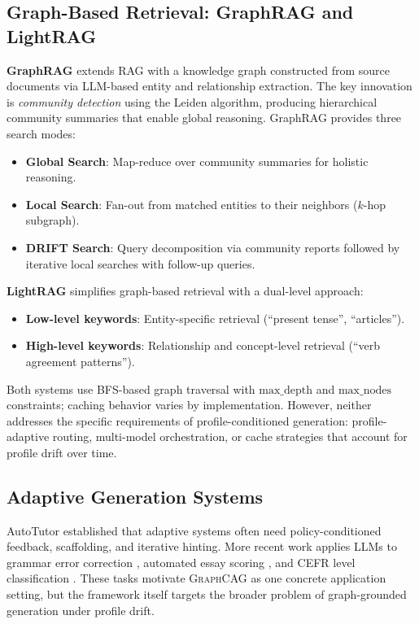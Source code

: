 \documentclass[11pt,a4paper,twocolumn]{article}
\newcommand{\graphcag}{\textsc{GraphCAG}}
\begin{document}
\subsection{Graph-Based Retrieval: GraphRAG and LightRAG}

\textbf{GraphRAG} \cite{edge2024graphrag} extends RAG with a knowledge graph constructed from source documents via LLM-based entity and relationship extraction. The key innovation is \emph{community detection} using the Leiden algorithm, producing hierarchical community summaries that enable global reasoning. GraphRAG provides three search modes:
\begin{itemize}[leftmargin=*]
  \item \textbf{Global Search}: Map-reduce over community summaries for holistic reasoning.
  \item \textbf{Local Search}: Fan-out from matched entities to their neighbors ($k$-hop subgraph).
  \item \textbf{DRIFT Search}: Query decomposition via community reports followed by iterative local searches with follow-up queries.
\end{itemize}

\textbf{LightRAG} \cite{guo2024lightrag} simplifies graph-based retrieval with a dual-level approach:
\begin{itemize}[leftmargin=*]
  \item \textbf{Low-level keywords}: Entity-specific retrieval (``present tense'', ``articles'').
  \item \textbf{High-level keywords}: Relationship and concept-level retrieval (``verb agreement patterns'').
\end{itemize}

Both systems use BFS-based graph traversal with $\text{max\_depth}$ and $\text{max\_nodes}$ constraints; caching behavior varies by implementation. However, neither addresses the specific requirements of profile-conditioned generation: profile-adaptive routing, multi-model orchestration, or cache strategies that account for profile drift over time.

\subsection{Adaptive Generation Systems}

AutoTutor \cite{graesser2004autotutor} established that adaptive systems often need policy-conditioned feedback, scaffolding, and iterative hinting. More recent work applies LLMs to grammar error correction \cite{fang2023gecllm}, automated essay scoring \cite{yang2020aes}, and CEFR level classification \cite{vajjala2018cefr}. These tasks motivate \graphcag{} as one concrete application setting, but the framework itself targets the broader problem of graph-grounded generation under profile drift.
\end{document}
